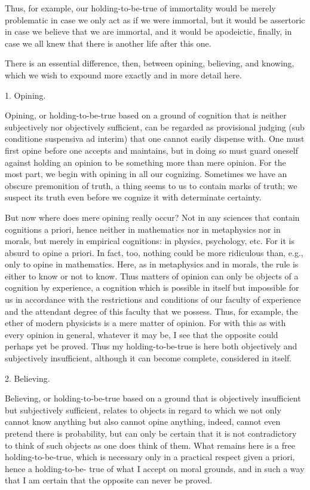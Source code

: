     Thus, for example, our holding-to-be-true of immortality would be
    merely problematic in case we only act as if we were immortal,
    but it would be assertoric in case we believe that we are immortal,
    and it would be apodeictic, finally, in case we all knew that
    there is another life after this one.

    There is an essential difference, then,
    between opining, believing, and knowing,
    which we wish to expound more exactly
    and in more detail here.

    1. Opining.

    Opining, or holding-to-be-true based on a ground of cognition
    that is neither subjectively nor objectively sufficient,
    can be regarded as provisional judging
    (sub conditione suspensiva ad interim)
    that one cannot easily dispense with.
    One must first opine before one accepts and maintains,
    but in doing so must guard oneself against holding an opinion
    to be something more than mere opinion.
    For the most part, we begin with
    opining in all our cognizing.
    Sometimes we have an obscure premonition of truth,
    a thing seems to us to contain marks of truth;
    we suspect its truth even before we cognize it
    with determinate certainty.

    But now where does mere opining really occur?
    Not in any sciences that contain cognitions a priori,
    hence neither in mathematics nor in metaphysics nor in morals,
    but merely in empirical cognitions: in physics, psychology, etc.
    For it is absurd to opine a priori.
    In fact, too, nothing could be more ridiculous than, e.g.,
    only to opine in mathematics.
    Here, as in metaphysics and in morals,
    the rule is either to know or not to know.
    Thus matters of opinion can only be
    objects of a cognition by experience,
    a cognition which is possible in itself
    but impossible for us in accordance
    with the restrictions and conditions of
    our faculty of experience
    and the attendant degree of this faculty that we possess.
    Thus, for example, the ether of modern physicists is
    a mere matter of opinion.
    For with this as with every opinion in general, whatever it may be,
    I see that the opposite could perhaps yet be proved.
    Thus my holding-to-be-true is here
    both objectively and subjectively insufficient,
    although it can become complete, considered in itself.

    2. Believing.

    Believing, or holding-to-be-true based on a ground that is
    objectively insufficient but subjectively sufficient, relates to objects in
    regard to which we not only cannot know anything but also cannot opine
    anything, indeed, cannot even pretend there is probability, but can only be
    certain that it is not contradictory to think of such objects as one does
    think of them. What remains here is a free holding-to-be-true, which is
    necessary only in a practical respect given a priori, hence a holding-to-be-
    true of what I accept on moral grounds, and in such a way that I am certain
    that the opposite can never be proved.

